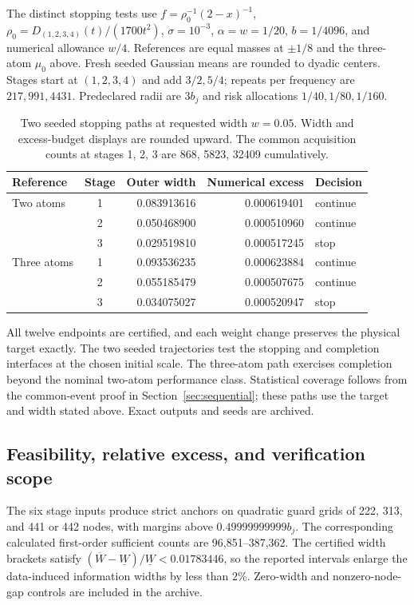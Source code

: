 \documentclass[10pt]{amsart}
\theoremstyle{definition}
\theoremstyle{remark}
\begin{document}
The distinct stopping tests use $f=\rho_0^{-1}(2-x)^{-1}$, $\rho_0=D_{(1,2,3,4)}(t)/(1700t^2)$, $\sigma=10^{-3}$, $\alpha=w=1/20$, $b=1/4096$, and numerical allowance $w/4$. References are equal masses at $\pm1/8$ and the three-atom $\mu_0$ above. Fresh seeded Gaussian means are rounded to dyadic centers. Stages start at $(1,2,3,4)$ and add $3/2,5/4$; repeats per frequency are $217,991,4431$. Predeclared radii are $3b_j$ and risk allocations $1/40,1/80,1/160$.
\begin{table}[tb]
\centering
\caption{Two seeded stopping paths at requested width $w=0.05$. Width and excess-budget displays are rounded upward. The common acquisition counts at stages 1, 2, 3 are 868, 5823, 32409 cumulatively.}\label{tab:stopping}
\begin{tabular}{lcrrl}\toprule
Reference & Stage & Outer width & Numerical excess & Decision\\\midrule
Two atoms & 1 & 0.083913616 & 0.000619401 & continue\\
 & 2 & 0.050468900 & 0.000510960 & continue\\
 & 3 & 0.029519810 & 0.000517245 & stop\\
Three atoms & 1 & 0.093536235 & 0.000623884 & continue\\
 & 2 & 0.055185479 & 0.000507675 & continue\\
 & 3 & 0.034075027 & 0.000520947 & stop\\
\bottomrule\end{tabular}
\end{table}

All twelve endpoints are certified, and each weight change preserves the physical target exactly. The two seeded trajectories test the stopping and completion interfaces at the chosen initial scale. The three-atom path exercises completion beyond the nominal two-atom performance class. Statistical coverage follows from the common-event proof in Section~\ref{sec:sequential}; these paths use the target and width stated above. Exact outputs and seeds are archived.

\subsection{Feasibility, relative excess, and verification scope}
The six stage inputs produce strict anchors on quadratic guard grids of 222, 313, and 441 or 442 nodes, with margins above $0.49999999999b_j$. The corresponding calculated first-order sufficient counts are 96,851--387,362. The certified width brackets satisfy $(\overline W-\underline W)/\underline W<0.01783446$, so the reported intervals enlarge the data-induced information widths by less than $2\%$. Zero-width and nonzero-node-gap controls are included in the archive.
\end{document}
